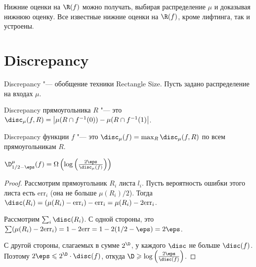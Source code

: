 \mycomment{\textcolor{red}{TODO: Добавить сюда комментарий про неправильную формулировку.}}

Нижние оценки на $\R(f)$ можно получать, выбирая распределение $\mu$ и доказывая нижнюю оценку.
Все известные нижние оценки на $\R(f)$, кроме лифтинга, так и устроены.

\section{Discrepancy}
Discrepancy "--- обобщение техники Rectangle Size. Пусть задано распределение на входах $\mu$.

\begin{definition}
Discrepancy прямоугольника $R$ "--- это $\disc_{\mu}(f, R) = \left|\mu(R\cap f^{-1}(0)) - \mu(R\cap f^{-1}(1)\right|$.

Discrepancy функции $f$ "--- это $\disc_\mu(f) = \max_R \disc_{\mu}(f, R)$ по всем прямоугольникам $R$.
\end{definition}

\begin{theorem}
$\D^\mu_{1/2-\eps}(f) = \Omega\left(\log\left(\frac{2\eps}{\disc_{\mu}(f)}\right)\right)$
\end{theorem}
\begin{proof}
Рассмотрим прямоугольник $R_i$ листа $l_i$. Пусть вероятность ошибки этого листа есть $\mathrm{err}_i$ (она не больше $\mu(R_i)/2$). Тогда $\disc(R_i) = (\mu(R_i) - \mathrm{err}_i) - \mathrm{err}_i = \mu(R_i) - 2\mathrm{err}_i$.

Рассмотрим $\sum_i \disc(R_i)$. С одной стороны, это $\sum (\mu(R_i) - 2\mathrm{err}_i) = 1 - 2\mathrm{err} = 1 - 2(1/2 - \eps) = 2\eps$.

С другой стороны, слагаемых в сумме $2^\D$, у каждого $\disc$ не больше $\disc(f)$. Поэтому $2\eps \leqslant 2^\D\cdot \disc(f)$, откуда $\D\geqslant \log\left(\frac{2\eps}{\disc(f)}\right)$.





\end{proof}

